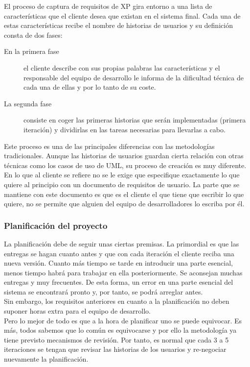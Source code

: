 \documentclass[12pt]{book} %
\begin{document}
			El proceso de captura de requisitos de XP gira entorno a una lista de características que el cliente desea que existan en el
			sistema final. Cada una de estas características recibe el nombre de historias de usuarios y su definición consta de dos fases:
						
			\begin{description}
				\item[En la primera fase] el cliente describe con sus propias palabras las características y el responsable del equipo de
					desarrollo le informa de la dificultad técnica de cada una de ellas y por lo tanto de su coste.
				\item[La segunda fase] consiste en coger las primeras historias que serán implementadas (primera iteración) y dividirlas 
					en las tareas necesarias para llevarlas a 	cabo.
			\end{description}
			
			Este proceso es una de las principales diferencias con las metodologías tradicionales. Aunque las historias de usuarios guardan
			cierta relación con otras técnicas como los casos de uso de UML, su proceso de creación es muy diferente. En lo que al cliente
			se refiere no se le exige que especifique exactamente lo que quiere al principio con un documento de requisitos de usuario. La
			parte que se mantiene con este documento es que es el cliente el que tiene que escribir lo que quiere, no se permite que alguien
			del equipo de desarrolladores lo escriba por él.
			
		\subsubsection{Planificación del proyecto}
			La planificación debe de seguir unas ciertas premisas. La primordial es que las entregas se hagan cuanto antes y que con cada
			iteración el cliente reciba una nueva  versión. Cuanto más tiempo se tarde en introducir una parte esencial, menos tiempo habrá
			para trabajar en ella posteriormente. Se aconsejan muchas entregas y muy frecuentes. De esta forma, un error en una parte
			esencial del sistema se encontrará pronto y, por tanto, se podrá arreglar antes.\\
			
			Sin embargo, los requisitos anteriores en cuanto a la planificación no deben suponer horas extra para el equipo de desarrollo.\\
			
			Pero lo mejor de todo es que a la hora de planificar uno se puede equivocar. Es más, todos sabemos que lo común es equivocarse y
			por ello la metodología ya tiene previsto mecanismos de revisión. Por tanto, es normal que cada 3 a 5 iteraciones se tengan que
			revisar las historias de los usuarios y re-negociar nuevamente la planificación.\\
			
\end{document}
